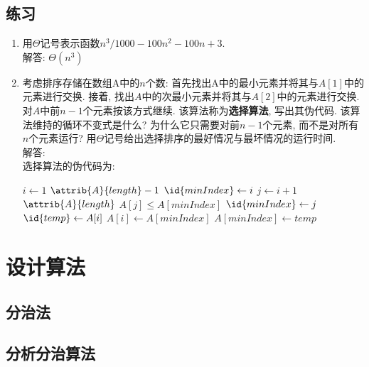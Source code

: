 \documentclass[UTF8,a4paper,zihao=-4,oneside,onecolumn,scheme=chinese,autoindent=true]{ctexbook}
\begin{document}
\subsection*{练习}
\begin{enumerate}
    \renewcommand{\labelenumi}{\thesection-\theenumi}
    \item {用$\Theta$记号表示函数$n^3/1000-100n^2-100n+3$.\\
          解答: $\Theta(n^3)$}
    \item {考虑排序存储在数组A中的$n$个数: 首先找出A中的最小元素并将其与$A[1]$中的元素进行交换. 接着, 找出$A$中的次最小元素并将其与$A[2]$中的元素进行交换. 对$A$中前$n-1$个元素按该方式继续. 该算法称为\textbf{选择算法}, 写出其伪代码. 该算法维持的循环不变式是什么? 为什么它只需要对前$n-1$个元素, 而不是对所有$n$个元素运行? 用$\Theta$记号给出选择排序的最好情况与最坏情况的运行时间.\\
          解答: \\
          选择算法的伪代码为:
          \begin{codebox}
              \li \For $i \gets 1$ \To $\attrib{A}{length} - 1$ \Do
              \li     $\id{minIndex} \gets i$
              \li     \For $j \gets i + 1$ \To $\attrib{A}{length}$ \Do
              \li         \If $A[j] \le A[minIndex]$ \Then
              \li             $\id{minIndex} \gets j$
              \End
              \End
              \li     $\id{temp} \gets A[i]$
              \li     $A[i] \gets A[minIndex]$
              \li     $A[minIndex] \gets temp$
              \End
          \end{codebox}
          }
\end{enumerate}

\section{设计算法}
\subsection{分治法}

\subsection{分析分治算法}

\end{document}
